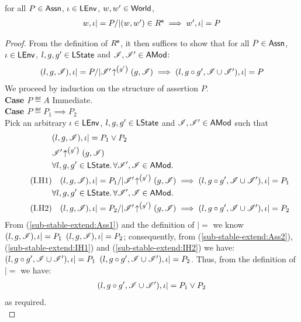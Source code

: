 %
\begin{lemma}[]\label{lem:sub-stable-extend}
for all $P \in \textsf{Assn}$, $\iota \in \textsf{LEnv}$, $w, w' \in \textsf{World}$, 
% 
\[
\begin{array}{@{} l @{}}
	w, \lenv |= P /| (w, w') \in \extendR 
	\implies  w', \lenv |= P
\end{array}
\]
%
\begin{proof}
From the definition of $R^{\textsf{e}}$, it then suffices to show that for all $P \in \textsf{Assn}$, $\iota \in \textsf{LEnv}$, $l, g, g' \in \textsf{LState}$ and $\mathscr{I}, \mathscr{I}' \in \textsf{AMod}$: 
% 
\[
\begin{array}{@{} l @{}}
	(l, g, \lmod), \lenv |= P /| 
	\expandsAM{\lmod'}{g'}{g}{\lmod}
	 \implies  (l, g \composeL g', \lmod \cup \lmod'), \lenv |= P
\end{array}
\]
%
We proceed by induction on the structure of assertion $P$.	\\

\noindent\textbf{Case $P \eqdef A$\quad} Immediate.\\
\noindent\textbf{Case $P \eqdef P_1 \implies P_2$} \\
Pick an arbitrary $\iota \in \textsf{LEnv}$, $l, g, g' \in \textsf{LState}$ and $\mathscr{I}, \mathscr{I}' \in \textsf{AMod}$ such that
%
\begin{align}
	& (l, g, \lmod), \lenv |= P_1 \lor P_2 \label{sub-stable-extend:Ass1}\\
%	
	&\expandsAM{\lmod'}{g'}{g}{\lmod} \label{sub-stable-extend:Ass2}\\
%	
	& \for{l, g, g' \in \LStates} \for{\lmod', \lmod\in \AMods} \nonumber\\
	\tag{I.H1} & 
	\quad (l, g, \lmod), \lenv |= P_1 /| \expandsAM{\lmod'}{g'}{g}{\lmod} \implies (l, g \composeL g', \lmod \cup \lmod'), \lenv |= P_1 \label{sub-stable-extend:IH1}\\ 
%
	& \for{l, g, g' \in \LStates} \for{\lmod', \lmod \in \AMods} \nonumber\\
	\tag{I.H2} & 
	\quad (l, g, \lmod), \lenv |= P_2 /| \expandsAM{\lmod'}{g'}{g}{\lmod} \implies (l, g \composeL g', \lmod \cup \lmod'), \lenv |= P_2 \label{sub-stable-extend:IH2}
%	
\end{align}
%
From (\ref{sub-stable-extend:Ass1}) and the definition of $|=$ we know $(l, g, \mathscr{I}), \iota |= P_1$  $(l, g, \mathscr{I}), \iota |= P_2$; consequently, from (\ref{sub-stable-extend:Ass2}), (\ref{sub-stable-extend:IH1}) and (\ref{sub-stable-extend:IH2}) we have: $(l, g \circ g', \mathscr{I} \cup \mathscr{I}'), \iota |= P_1$  $(l, g \circ g', \mathscr{I} \cup \mathscr{I}'), \iota |= P_2$. Thus, from the definition of $|=$ we have:
%
\begin{align*}
	(l, g \circ g', \mathscr{I} \cup \mathscr{I}'), \iota |= P_1 \lor P_2
\end{align*}
%
as required.\\


\end{proof}
\end{lemma}
